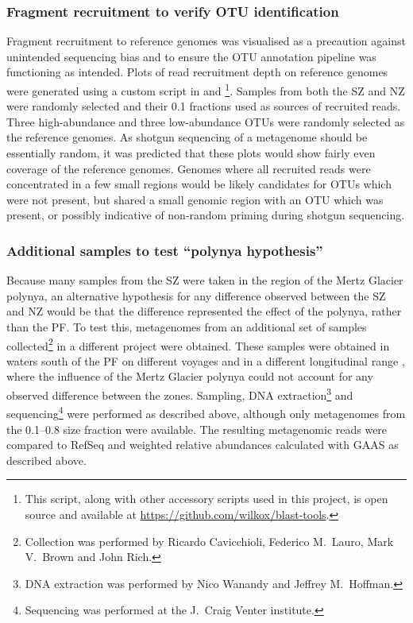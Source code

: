 \subsubsection{Fragment recruitment to verify \ac{OTU} identification}
Fragment recruitment to reference genomes was visualised as a precaution against unintended sequencing bias and to ensure the \ac{OTU} annotation pipeline was functioning as intended.
Plots of read recruitment depth on reference genomes were generated using a custom script in  and \footnote{This script, along with other accessory scripts used in this project, is open source and available at \url{https://github.com/wilkox/blast-tools}.}.
Samples from both the \ac{SZ} and \ac{NZ} were randomly selected and their 0.1 \micron{} fractions used as sources of recruited reads.
Three high-abundance and three low-abundance \acp{OTU} were randomly selected as the reference genomes.
As shotgun sequencing of a metagenome should be essentially random, it was predicted that these plots would show fairly even coverage of the reference genomes.
Genomes where all recruited reads were concentrated in a few small regions would be likely candidates for \acp{OTU} which were not present, but shared a small genomic region with an \ac{OTU} which was present, or possibly indicative of non-random priming during shotgun sequencing.

\subsubsection{Additional samples to test ``polynya hypothesis''}
Because many samples from the \ac{SZ} were taken in the region of the Mertz Glacier polynya, an alternative hypothesis for any difference observed between the \ac{SZ} and \ac{NZ} would be that the difference represented the effect of the polynya, rather than the \ac{PF}.
To test this, metagenomes from an additional set of samples collected\footnote{Collection was performed by Ricardo Cavicchioli, Federico M.\ Lauro, Mark V.\ Brown and John Rich.} in a different project were obtained.
These samples were obtained in waters south of the \ac{PF} on different voyages and in a different longitudinal range , where the influence of the Mertz Glacier polynya could not account for any observed difference between the zones.
Sampling, DNA extraction\footnote{DNA extraction was performed by Nico Wanandy and Jeffrey M.\ Hoffman.} and sequencing\footnote{Sequencing was performed at the J.\ Craig Venter institute.} were performed as described above, although only metagenomes from the 0.1--0.8 \micron{} size fraction were available.
The resulting metagenomic reads were compared to RefSeq and weighted relative abundances calculated with \ac{GAAS} as described above.

